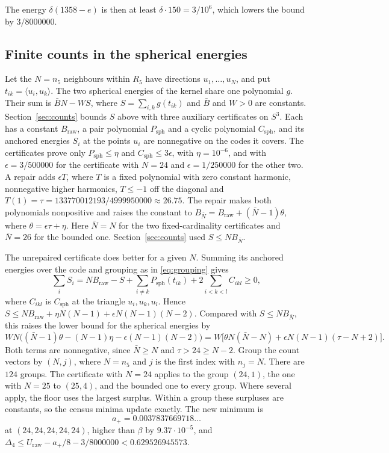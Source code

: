 \documentclass[11pt]{amsart}
\numberwithin{equation}{section}
\theoremstyle{remark}
\newcommand{\ip}[2]{\langle #1,#2\rangle}
\begin{document}
The energy $\delta(1358-e)$ is then at least $\delta\cdot150=3/10^6$, which lowers the bound by $3/8000000$.

\subsection*{Finite counts in the spherical energies}
Let the $N=n_5$ neighbours within $R_5$ have directions $u_1,\dots,u_N$, and put $t_{ik}=\ip{u_i}{u_k}$. The two spherical energies of the kernel share one polynomial $g$. Their sum is $\bar BN-WS$, where $S=\sum_{i,k}g(t_{ik})$ and $\bar B$ and $W>0$ are constants. Section~\ref{sec:counts} bounds $S$ above with three auxiliary certificates on $S^3$. Each has a constant $B_{\mathrm{raw}}$, a pair polynomial $P_{\mathrm{sph}}$ and a cyclic polynomial $C_{\mathrm{sph}}$, and its anchored energies $S_i$ at the points $u_i$ are nonnegative on the codes it covers. The certificates prove only $P_{\mathrm{sph}}\le\eta$ and $C_{\mathrm{sph}}\le3\epsilon$, with $\eta=10^{-6}$, and with $\epsilon=3/500000$ for the certificate with $N=24$ and $\epsilon=1/250000$ for the other two. A repair adds $\epsilon T$, where $T$ is a fixed polynomial with zero constant harmonic, nonnegative higher harmonics, $T\le-1$ off the diagonal and $T(1)=\tau=133770012193/4999950000\approx26.75$. The repair makes both polynomials nonpositive and raises the constant to $B_{\bar N}=B_{\mathrm{raw}}+(\bar N-1)\theta$, where $\theta=\epsilon\tau+\eta$. Here $\bar N=N$ for the two fixed-cardinality certificates and $\bar N=26$ for the bounded one. Section~\ref{sec:counts} used $S\le NB_{\bar N}$.

The unrepaired certificate does better for a given $N$. Summing its anchored energies over the code and grouping as in \eqref{eq:grouping} gives
\[
\sum_iS_i=NB_{\mathrm{raw}}-S+\sum_{i\ne k}P_{\mathrm{sph}}(t_{ik})+2\sum_{i<k<l}C_{ikl}\ge0,
\]
where $C_{ikl}$ is $C_{\mathrm{sph}}$ at the triangle $u_i,u_k,u_l$. Hence $S\le NB_{\mathrm{raw}}+\eta N(N-1)+\epsilon N(N-1)(N-2)$. Compared with $S\le NB_{\bar N}$, this raises the lower bound for the spherical energies by
\[
WN\bigl((\bar N-1)\theta-(N-1)\eta-\epsilon(N-1)(N-2)\bigr)=W\bigl[\theta N(\bar N-N)+\epsilon N(N-1)(\tau-N+2)\bigr].
\]
Both terms are nonnegative, since $\bar N\ge N$ and $\tau>24\ge N-2$. Group the count vectors by $(N,j)$, where $N=n_5$ and $j$ is the first index with $n_j=N$. There are $124$ groups. The certificate with $N=24$ applies to the group $(24,1)$, the one with $N=25$ to $(25,4)$, and the bounded one to every group. Where several apply, the floor uses the largest surplus. Within a group these surpluses are constants, so the census minima update exactly. The new minimum is
\[
a_+=0.0037837669718\ldots
\]
at $(24,24,24,24,24)$, higher than $\beta$ by $9.37\cdot10^{-5}$, and $\Delta_4\le U_{\mathrm{raw}}-a_+/8-3/8000000<0.629526945573$.
\end{document}
